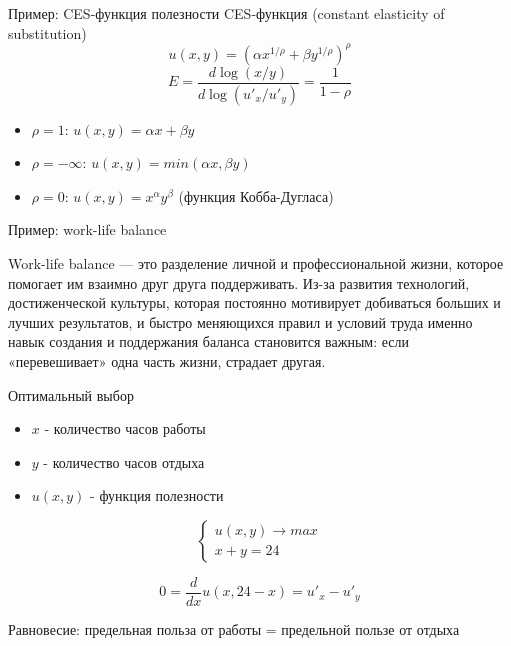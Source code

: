 \documentclass{beamer}
\begin{document}
\begin{frame}{Пример: CES-функция полезности}
CES-функция (constant elasticity of substitution) 
    $$
    u(x,y) = (\alpha x^{1/\rho} + \beta y^{1/\rho})^\rho 
    $$
$$
E = \frac{d \log(x/y)}{ d \log(u'_x/u'_y)} = \frac{1}{1-\rho}
$$
    
\begin{itemize}
    \item $\rho=1$: $u(x,y) = \alpha x + \beta y $
    \item $\rho=-\infty$: $u(x,y) = min(\alpha x,\beta y)$
    \item $\rho=0$: $u(x,y) = x^{\alpha}y^{\beta}$ (функция Кобба-Дугласа)
    
\end{itemize}
    
\end{frame}


\begin{frame}{Пример: work-life balance}

Work-life balance — это разделение личной и профессиональной жизни, которое помогает им взаимно друг друга поддерживать. Из-за развития технологий, достиженческой культуры, которая постоянно мотивирует добиваться больших и лучших результатов, и быстро меняющихся правил и условий труда именно навык создания и поддержания баланса становится важным: если «перевешивает» одна часть жизни, страдает другая.
    
\end{frame}


\begin{frame}{Оптимальный выбор}

\begin{itemize}
    \item $x$ - количество часов работы
    \item $y$ - количество часов отдыха
    \item $u(x,y)$ - функция полезности
\end{itemize}

\begin{equation}
    \begin{cases}
      u(x,y) \to max\\
        x+ y = 24 
    \end{cases}
\end{equation}

$$
0 = \frac{d}{dx} u(x, 24-x) = u'_x - u'_y
$$

Равновесие: предельная польза от работы = предельной пользе от отдыха
\end{frame}
\end{document}
